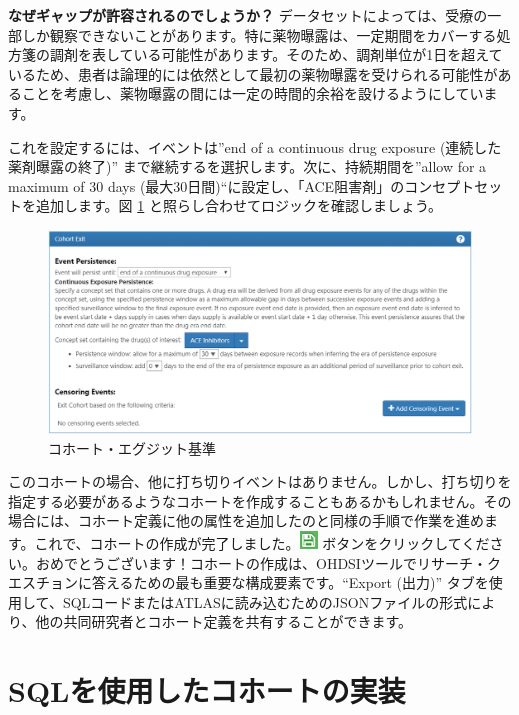 \documentclass[
  11pt]{book}
\theoremstyle{definition}
\theoremstyle{definition}
\theoremstyle{definition}
\theoremstyle{definition}
\theoremstyle{remark}
\begin{document}
\textbf{なぜギャップが許容されるのでしょうか？} データセットによっては、受療の一部しか観察できないことがあります。特に薬物曝露は、一定期間をカバーする処方箋の調剤を表している可能性があります。そのため、調剤単位が1日を超えているため、患者は論理的には依然として最初の薬物曝露を受けられる可能性があることを考慮し、薬物曝露の間には一定の時間的余裕を設けるようにしています。

これを設定するには、イベントは''end of a continuous drug exposure (連続した薬剤曝露の終了)'' まで継続するを選択します。次に、持続期間を''allow for a maximum of 30 days (最大30日間)``に設定し、「ACE阻害剤」のコンセプトセットを追加します。図 \ref{fig:ATLAScohortexit} と照らし合わせてロジックを確認しましょう。

\begin{figure}

{\centering \includegraphics[width=1\linewidth]{images/Cohorts/cohort-exit} 

}

\caption{コホート・エグジット基準}\label{fig:ATLAScohortexit}
\end{figure}

このコホートの場合、他に打ち切りイベントはありません。しかし、打ち切りを指定する必要があるようなコホートを作成することもあるかもしれません。その場合には、コホート定義に他の属性を追加したのと同様の手順で作業を進めます。これで、コホートの作成が完了しました。\includegraphics{images/Cohorts/save.png} ボタンをクリックしてください。おめでとうございます！コホートの作成は、OHDSIツールでリサーチ・クエスチョンに答えるための最も重要な構成要素です。``Export (出力)'' タブを使用して、SQLコードまたはATLASに読み込むためのJSONファイルの形式により、他の共同研究者とコホート定義を共有することができます。

\section{SQLを使用したコホートの実装}\label{sqlux3092ux4f7fux7528ux3057ux305fux30b3ux30dbux30fcux30c8ux306eux5b9fux88c5}
\end{document}
